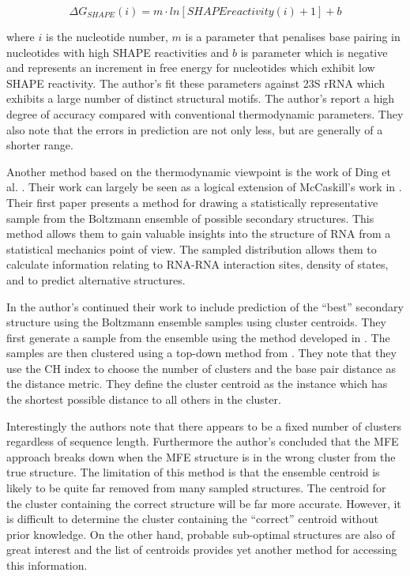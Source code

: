 \documentclass[journal]{IEEEtran}
\begin{document}
\begin{equation}
	\Delta G_{SHAPE}(i) = m \cdot ln[SHAPEreactivity(i) + 1] + b
\end{equation}

where $i$ is the nucleotide number, $m$ is a parameter that penalises base pairing in nucleotides with high SHAPE reactivities and $b$ is parameter which is negative and represents an increment in free energy for nucleotides which exhibit low SHAPE reactivity. The author's fit these parameters against 23S rRNA which exhibits a large number of distinct structural motifs. The author's report a high degree of accuracy compared with conventional thermodynamic parameters. They also note that the errors in prediction are not only less, but are generally of a shorter range.

Another method based on the thermodynamic viewpoint is the work of Ding et al. \cite{ding2003statistical, ding2005rna}. Their work can largely be seen as a logical extension of McCaskill's work in \cite{mccaskill1990equilibrium}. Their first paper \cite{ding2003statistical} presents a method for drawing a statistically representative sample from the Boltzmann ensemble of possible secondary structures. This method allows them to gain valuable insights into the structure of RNA from a statistical mechanics point of view. The sampled distribution allows them to calculate information relating to RNA-RNA interaction sites, density of states, and to predict alternative structures.

In \cite{ding2005rna} the author's continued their work to include prediction of the ``best'' secondary structure using the Boltzmann ensemble samples using cluster centroids. They first generate a sample from the ensemble using the method developed in \cite{ding2003statistical}. The samples are then clustered using a top-down method from \cite{rousseeuw1990finding}. They note that they use the CH index to choose the number of clusters and the base pair distance as the distance metric. They define the cluster centroid as the instance which has the shortest possible distance to all others in the cluster.

Interestingly the authors note that there appears to be a fixed number of clusters regardless of sequence length. Furthermore the author's concluded that the MFE approach breaks down when the MFE structure is in the wrong cluster from the true structure. The limitation of this method is that the ensemble centroid is likely to be quite far removed from many sampled structures. The centroid for the cluster containing the correct structure will be far more accurate. However, it is difficult to determine the cluster containing the ``correct'' centroid without prior knowledge. On the other hand, probable sub-optimal structures are also of great interest and the list of centroids provides yet another method for accessing this information.
\end{document}
